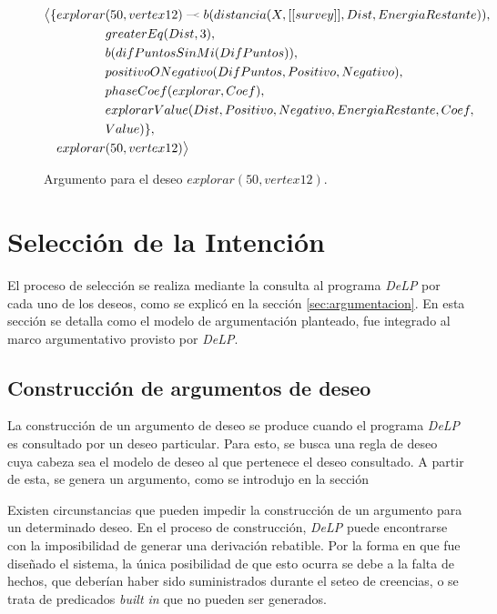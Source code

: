 \documentclass[oneside]{book}
\theoremstyle{definition}
\theoremstyle{example}
\newcommand{\defleftarrow}{{\raise1.5pt\hbox{\tiny\defleft}}}
\newcommand{\defleft}{\mbox{---\hspace{-1.5pt}\raise.05pt\hbox{$<$}}}
\begin{document}
\begin{figure}


\begin{align*}
\bigl\langle \{explorar&(50, vertex12)\; \defleftarrow \;	
    b(distancia(X, [[survey]], Dist, EnergiaRestante)), \\
    &greaterEq(Dist, 3),\\
    &b(difPuntosSinMi(DifPuntos)),\\
    &positivoONegativo(DifPuntos, Positivo, Negativo),\\
    &phaseCoef(explorar, Coef),\\
    &explorarValue(Dist, Positivo, Negativo, EnergiaRestante, Coef,\\
    	&Value)\}, \\
explorar&(50, vertex12) \bigr\rangle 
\end{align*}
\caption{Argumento para el deseo $explorar(50, vertex12)$.}
\label{fig:ejemploArgDeseo}
\end{figure}

\section{Selección de la Intención}

El proceso de selección se realiza mediante la consulta al programa \textit{DeLP} por cada
uno de los deseos, como se explicó en la sección \ref{sec:argumentacion}. 
En esta sección se detalla como el modelo de argumentación planteado, fue integrado al marco
argumentativo provisto por \textit{DeLP}.

\subsection{Construcción de argumentos de deseo}

La construcción de un argumento de deseo se produce cuando el programa \textit{DeLP} es 
consultado por un deseo particular. Para esto, se busca una regla de deseo cuya cabeza sea
el modelo de deseo al que pertenece el deseo consultado. A partir de esta, se genera un 
argumento, como se introdujo en la sección %

Existen circunstancias que pueden impedir la construcción de un argumento para un determinado
deseo. En el proceso de construcción, \textit{DeLP} puede encontrarse con la imposibilidad de generar
una derivación rebatible. Por la forma en que fue diseñado el sistema, la única posibilidad de
que esto ocurra se debe a la falta de hechos, que deberían haber sido suministrados durante el
seteo de creencias, o se trata de predicados \textit{built in} que no pueden ser generados. 
\end{document}
